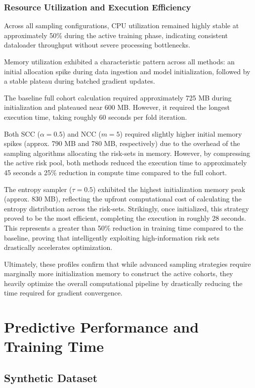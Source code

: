 \documentclass[a4paper,twoside,12pt]{report}
\begin{document}
\subsubsection{Resource Utilization and Execution Efficiency}

Across all sampling configurations, CPU utilization remained highly stable at approximately 50\% during the active training phase, indicating consistent dataloader throughput without severe processing bottlenecks. 

Memory utilization exhibited a characteristic pattern across all methods: an initial allocation spike during data ingestion and model initialization, followed by a stable plateau during batched gradient updates. 

The baseline full cohort calculation required approximately 725 MB during initialization and plateaued near 600 MB. However, it required the longest execution time, taking roughly 60 seconds per fold iteration.

Both SCC ($\alpha=0.5$) and NCC ($m=5$) required slightly higher initial memory spikes (approx. 790 MB and 780 MB, respectively) due to the overhead of the sampling algorithms allocating the risk-sets in memory. However, by compressing the active risk pool, both methods reduced the execution time to approximately 45 seconds a 25\% reduction in compute time compared to the full cohort.

The entropy sampler ($\tau=0.5$) exhibited the highest initialization memory peak (approx. 830 MB), reflecting the upfront computational cost of calculating the entropy distribution across the risk-sets. Strikingly, once initialized, this strategy proved to be the most efficient, completing the execution in roughly 28 seconds. This represents a greater than 50\% reduction in training time compared to the baseline, proving that intelligently exploiting high-information risk sets drastically accelerates optimization.

Ultimately, these profiles confirm that while advanced sampling strategies require marginally more initialization memory to construct the active cohorts, they heavily optimize the overall computational pipeline by drastically reducing the time required for gradient convergence.

\section{Predictive Performance and Training Time}
\subsection{Synthetic Dataset}
\end{document}
